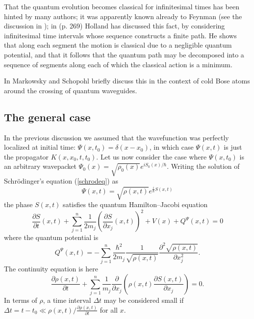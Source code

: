 \documentclass[12pt]{article}%
\begin{document}
That the quantum evolution becomes classical for infinitesimal times has been
hinted by many authors; it was apparently known already to Feynman \cite{FH}
(see the discussion in \cite{Ali}); in \cite{Holland} (p. 269) Holland has
discussed this fact, by considering infinitesimal time intervals whose
sequence constructs a finite path. He shows that along each segment the motion
is classical due to a negligible quantum potential, and that it follows that
the quantum path may be decomposed into a sequence of segments along each of
which the classical action is a minimum.

In \cite{MaSch} Markowsky and Schopohl briefly discuss this in the context of
cold Bose atoms around the crossing of quantum waveguides.

\subsection{The general case\label{subsec2.1}}

In the previous discussion we assumed that the wavefunction was perfectly
localized at initial time: $\Psi(x,t_{0})=\delta(x-x_{0})$, in which case
$\Psi(x,t)$ is just the propagator $K(x,x_{0},t,t_{0})$. Let us now consider
the case where $\Psi(x,t_{0})$ is an arbitrary wavepacket $\Psi_{0}%
(x)=\sqrt{\rho_{0}(x)}e^{iS_{0}(x)/\hbar}$. Writing the solution of
Schr\"{o}dinger's equation (\ref{schrodeq}) as%
\[
\Psi(x,t)=\sqrt{\rho(x,t)}e^{\frac{i}{\hbar}S(x,t)}%
\]
the phase $S(x,t)$ satisfies the quantum Hamilton--Jacobi equation
\begin{equation}
\frac{\partial S}{\partial t}(x,t)+\sum_{j=1}^{n}\frac{1}{2m_{j}}\left(
\frac{\partial S}{\partial x_{j}}(x,t)\right)  ^{2}+V(x)+Q^{\Psi}(x,t)=0
\label{HJ1bis}%
\end{equation}
where the quantum potential is
\begin{equation}
Q^{\Psi}(x,t)=-\sum_{j=1}^{n}\frac{\hbar^{2}}{2m_{j}}\frac{1}{\sqrt{\rho
(x,t)}}\frac{\partial^{2}\sqrt{\rho(x,t)}}{\partial x_{j}^{2}}. \label{qpsi}%
\end{equation}
The continuity equation is here
\begin{equation}
\frac{\partial\rho(x,t)}{\partial t}+\sum_{j=1}^{n}\frac{1}{m_{j}}%
\frac{\partial}{\partial x_{j}}\left(  \rho(x,t)\frac{\partial S(x,t)}%
{\partial x_{j}}\right)  =0. \label{CO2}%
\end{equation}
In terms of $\rho$, a time interval $\Delta t$ may be considered small if
$\Delta t = t-t_{0} \ll\rho(x,t)/\frac{ \partial\rho(x,t)}{\partial t}$ for
all $x$.
\end{document}
